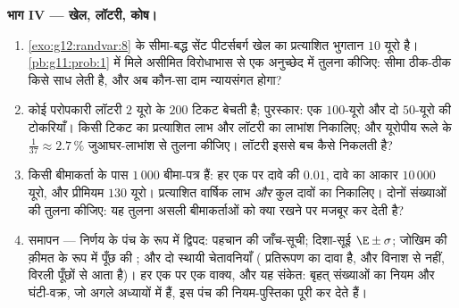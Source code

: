 \begin{problem}
\medskip
\noindent\textbf{भाग IV --- खेल, लॉटरी, कोष।}
\begin{enumerate}[resume]
  \item \cref{exo:g12:randvar:8} के सीमा-बद्ध सेंट पीटर्सबर्ग खेल का प्रत्याशित भुगतान $10$
        यूरो है। \cref{pb:g11:prob:1} में मिले असीमित विरोधाभास से एक अनुच्छेद में तुलना
        कीजिए: सीमा ठीक-ठीक किसे साध लेती है, और अब कौन-सा दाम न्यायसंगत
        होगा?
  \item कोई परोपकारी लॉटरी $2$ यूरो के $200$ टिकट बेचती है; पुरस्कार: एक
        $100$-यूरो और दो $50$-यूरो की टोकरियाँ। किसी टिकट का प्रत्याशित
        लाभ और लॉटरी का लाभांश निकालिए; और यूरोपीय रूले के $\frac{1}{37} \approx 2.7\,\%$ जुआघर-लाभांश
        से तुलना कीजिए। लॉटरी इससे बच कैसे निकलती है?
  \item किसी बीमाकर्ता के पास $1\,000$  बीमा-पत्र हैं: हर एक पर दावे की
         $0.01$, दावे का आकार $10\,000$ यूरो, और प्रीमियम $130$ यूरो।
        प्रत्याशित वार्षिक लाभ \emph{और} कुल दावों का  निकालिए।
        दोनों संख्याओं की तुलना कीजिए: यह तुलना असली बीमाकर्ताओं को क्या
        रखने पर मजबूर कर देती है?
  \item समापन --- निर्णय के पंच के रूप में द्विपद: पहचान की जाँच-सूची;
        दिशा-सूई $\E \pm \sigma$; जोखिम की क़ीमत के रूप में पूँछ की ; और दो
        स्थायी चेतावनियाँ ( प्रतिरूपण का दावा है, और विनाश 
        से नहीं, विरली पूँछों से आता है)। हर एक पर एक वाक्य, और यह संकेत:
        बृहत् संख्याओं का नियम और घंटी-वक्र, जो अगले अध्यायों में हैं, इस
        पंच की नियम-पुस्तिका पूरी कर देते हैं।
\end{enumerate}
\end{problem}
